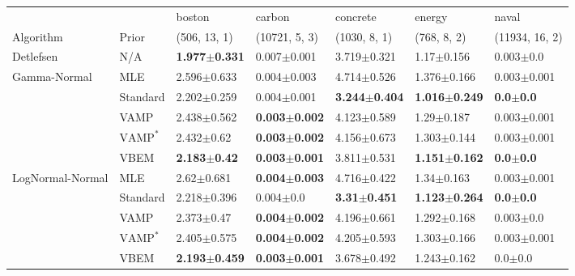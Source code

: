 \begin{tabular}{lllllll}
\toprule
                 &      &                    boston &                    carbon &                  concrete &                    energy &                 naval \\
Algorithm & Prior& (506, 13, 1)& (10721, 5, 3)& (1030, 8, 1)& (768, 8, 2)& (11934, 16, 2)\\
\midrule
Detlefsen & N/A &  \textbf{1.977$\pm$0.331} &           0.007$\pm$0.001 &           3.719$\pm$0.321 &            1.17$\pm$0.156 &         0.003$\pm$0.0 \\
Gamma-Normal & MLE &           2.596$\pm$0.633 &           0.004$\pm$0.003 &           4.714$\pm$0.526 &           1.376$\pm$0.166 &       0.003$\pm$0.001 \\
                 & Standard &           2.202$\pm$0.259 &           0.004$\pm$0.001 &  \textbf{3.244$\pm$0.404} &  \textbf{1.016$\pm$0.249} &  \textbf{0.0$\pm$0.0} \\
                 & VAMP &           2.438$\pm$0.562 &  \textbf{0.003$\pm$0.002} &           4.123$\pm$0.589 &            1.29$\pm$0.187 &       0.003$\pm$0.001 \\
                 & $\text{VAMP}^*$ &            2.432$\pm$0.62 &  \textbf{0.003$\pm$0.002} &           4.156$\pm$0.673 &           1.303$\pm$0.144 &       0.003$\pm$0.001 \\
                 & VBEM &   \textbf{2.183$\pm$0.42} &  \textbf{0.003$\pm$0.001} &           3.811$\pm$0.531 &  \textbf{1.151$\pm$0.162} &  \textbf{0.0$\pm$0.0} \\
LogNormal-Normal & MLE &            2.62$\pm$0.681 &  \textbf{0.004$\pm$0.003} &           4.716$\pm$0.422 &            1.34$\pm$0.163 &       0.003$\pm$0.001 \\
                 & Standard &           2.218$\pm$0.396 &             0.004$\pm$0.0 &   \textbf{3.31$\pm$0.451} &  \textbf{1.123$\pm$0.264} &  \textbf{0.0$\pm$0.0} \\
                 & VAMP &            2.373$\pm$0.47 &  \textbf{0.004$\pm$0.002} &           4.196$\pm$0.661 &           1.292$\pm$0.168 &         0.003$\pm$0.0 \\
                 & $\text{VAMP}^*$ &           2.405$\pm$0.575 &  \textbf{0.004$\pm$0.002} &           4.205$\pm$0.593 &           1.303$\pm$0.166 &       0.003$\pm$0.001 \\
                 & VBEM &  \textbf{2.193$\pm$0.459} &  \textbf{0.003$\pm$0.001} &           3.678$\pm$0.492 &           1.243$\pm$0.162 &           0.0$\pm$0.0 \\

\end{tabular}
